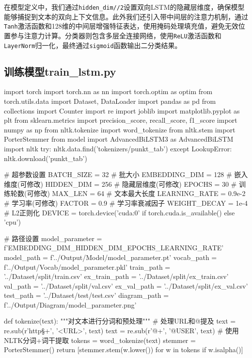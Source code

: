 在模型定义中，我们通过\verb|hidden_dim//2|设置双向LSTM的隐藏层维度，确保模型能够捕捉到文本的双向上下文信息。此外我们还引入带中间层的注意力机制，通过\verb|Tanh|激活函数和128维的中间层增强特征表达，使用掩码处理填充值，避免无效位置参与注意力计算。分类器则包含多层全连接网络，使用\verb|ReLU|激活函数和\verb|LayerNorm|归一化，最终通过\verb|sigmoid|函数输出二分类结果。

\vspace{1em}
\subsection{训练模型train\_lstm.py}
\begin{codeblock}[language=Python]
import torch
import torch.nn as nn
import torch.optim as optim
from torch.utils.data import Dataset, DataLoader
import pandas as pd
from collections import Counter
import re
import joblib
import matplotlib.pyplot as plt
from sklearn.metrics import precision_score, recall_score, f1_score
import numpy as np
from nltk.tokenize import word_tokenize
from nltk.stem import PorterStemmer
from model import AdvancedBiLSTM3 as AdvancedBiLSTM
import nltk
try:
    nltk.data.find('tokenizers/punkt_tab')
except LookupError:
    nltk.download('punkt_tab')

# 超参数设置
BATCH_SIZE = 32         # 批大小
EMBEDDING_DIM = 128     # 嵌入维度(可修改)
HIDDEN_DIM = 256        # 隐藏层维度(可修改)
EPOCHS = 30             # 训练轮数(可修改)
MAX_LEN = 64            # 文本最大长度
LEARNING_RATE = 0.9e-2  # 学习率(可修改)
FACTOR = 0.9            # 学习率衰减因子
WEIGHT_DECAY = 1e-4     # L2正则化
DEVICE = torch.device('cuda:0' if torch.cuda.is_available() else 'cpu') 

# 路径设置
model_parameter = f'{EMBEDDING_DIM}_{HIDDEN_DIM}_{EPOCHS}_{LEARNING_RATE}'
model_path = f'../Output/Model/{model_parameter}.pt'
vocab_path = f'../Output/Vocab/{model_parameter}.pkl'
train_path = '../Dataset/split/train.csv'
ex_train_path = '../Dataset/split/ex_train.csv'
val_path = '../Dataset/split/val.csv'
ex_val_path = '../Dataset/split/ex_val.csv'
test_path = '../Dataset/test/test.csv'
diagram_path = f'../Output/Diagram/{model_parameter}.png'

def tokenize(text):
    """对文本进行分词和预处理"""
    # 处理URL和@提及
    text = re.sub(r'http\S+', '<URL>', text)
    text = re.sub(r'@\w+', '@USER', text)
    # 使用NLTK分词+词干提取
    tokens = word_tokenize(text)
    stemmer = PorterStemmer()
    return [stemmer.stem(w.lower()) for w in tokens if w.isalpha()]


\end{codeblock}
